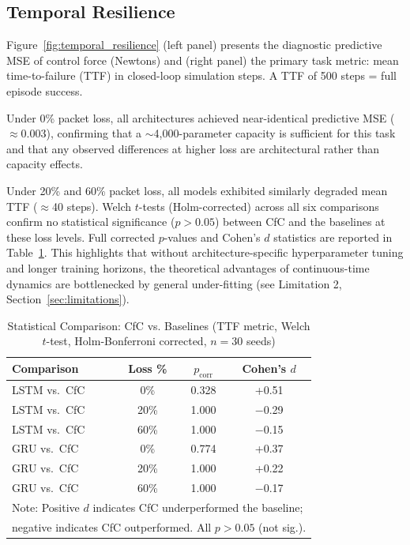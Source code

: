 \documentclass[conference]{IEEEtran}
\begin{document}
\subsection{Temporal Resilience}
Figure~\ref{fig:temporal_resilience} (left panel) presents the diagnostic
predictive MSE of control force (Newtons) and (right panel) the primary task
metric: mean time-to-failure (TTF) in closed-loop simulation steps. A TTF of
500 steps = full episode success.

Under 0\% packet loss, all architectures achieved near-identical predictive
MSE ($\approx\!0.003$), confirming that a $\sim$4,000-parameter capacity is
sufficient for this task and that any observed differences at higher loss are
architectural rather than capacity effects.

Under 20\% and 60\% packet loss, all models exhibited similarly degraded
mean TTF ($\approx$40 steps). Welch $t$-tests (Holm-corrected) across all
six comparisons confirm no statistical significance ($p > 0.05$) between CfC
and the baselines at these loss levels. Full corrected $p$-values and Cohen's $d$
statistics are reported in Table~\ref{tab:stats}. This highlights that without
architecture-specific hyperparameter tuning and longer training horizons, the
theoretical advantages of continuous-time dynamics are bottlenecked by general
under-fitting (see Limitation 2, Section~\ref{sec:limitations}).

\begin{table}[h]
\centering
\caption{Statistical Comparison: CfC vs. Baselines (TTF metric,
         Welch $t$-test, Holm-Bonferroni corrected, $n=30$ seeds)}
\label{tab:stats}
\begin{tabular}{|l|c|c|c|}
\hline
\textbf{Comparison} & \textbf{Loss \%} & \textbf{$p_\text{corr}$} & \textbf{Cohen's $d$} \\ \hline
LSTM vs.\ CfC & 0\%  & 0.328 & +0.51 \\ \hline
LSTM vs.\ CfC & 20\% & 1.000 & $-$0.29 \\ \hline
LSTM vs.\ CfC & 60\% & 1.000 & $-$0.15 \\ \hline
GRU  vs.\ CfC & 0\%  & 0.774 & +0.37 \\ \hline
GRU  vs.\ CfC & 20\% & 1.000 & +0.22 \\ \hline
GRU  vs.\ CfC & 60\% & 1.000 & $-$0.17 \\ \hline
\multicolumn{4}{|l|}{\small Note: Positive $d$ indicates CfC underperformed the baseline;} \\
\multicolumn{4}{|l|}{\small negative indicates CfC outperformed. All $p > 0.05$ (not sig.).} \\ \hline
\end{tabular}
\end{table}
\end{document}
